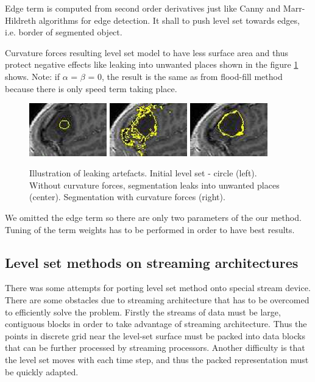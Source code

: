 Edge term is computed from second order derivatives just like Canny and Marr-Hildreth algorithms for edge detection.
It shall to push level set towards edges, i.e. border of segmented object.

Curvature forces resulting level set model to have less surface area and thus protect negative effects like leaking into unwanted places shown in the figure \ref{fg:leaking} shows.
Note: if $\alpha$ = $\beta$ = 0, the result is the same as from flood-fill method because there is only speed term taking place.

\begin{figure}
    \centering
    \includegraphics[width=0.3\textwidth]{data/png/leaking1}
    \includegraphics[width=0.3\textwidth]{data/png/leaking2}
    \includegraphics[width=0.3\textwidth]{data/png/leaking3}
    \caption[Leaking]{Illustration of leaking artefacts.
    Initial level set - circle (left).
    Without curvature forces, segmentation leaks into unwanted places (center).
    Segmentation with curvature forces (right).
}
    \label{fg:leaking}
\end{figure}

We omitted the edge term so there are only two parameters of the our method.
Tuning of the term weights has to be performed in order to have best results.

\subsection{Level set methods on streaming architectures}

\par
There was some attempts for porting level set method onto special stream device.
There are some obstacles due to streaming architecture that has to be overcomed to efficiently solve the problem.
Firstly the streams of data must be large, contiguous blocks in order to take advantage of streaming architecture.
Thus the points in discrete grid near the level-set surface must be packed into data blocks that can be further processed by streaming processors.
Another difficulty is that the level set moves with each time step, and thus the packed representation must be quickly adapted.

